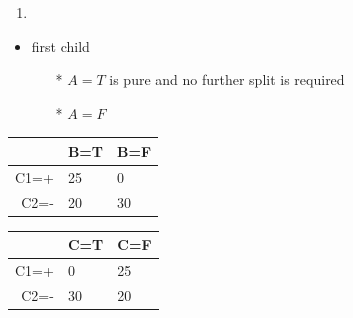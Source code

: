 \documentclass[11pt]{article}
\providecommand{\tightlist}{%
      \setlength{\itemsep}{0pt}\setlength{\parskip}{0pt}}
\begin{document}
    \begin{enumerate}
\def\labelenumi{(\alph{enumi})}
\setcounter{enumi}{1}
\item
\end{enumerate}

\begin{itemize}
\tightlist
\item
  first child

  \begin{itemize}
  \tightlist
  \item[*]
    \(A=T\) is pure and no further split is required
  \item[*]
    \(A=F\)
  \end{itemize}
\end{itemize}


\begin{table}[H]
	\centering
\begin{tabular}{|r|l|l|}
              & B=T & B=F \\
            \hline
                 C1=+ &  25    & 0 \\
                 C2=-   &  20    & 30 \\
\end{tabular}
\end{table}

\begin{table}[H]
	\centering
\begin{tabular}{|r|l|l|}
              & C=T & C=F \\
            \hline
                 C1=+ &  0    & 25 \\
                 C2=-   &  30    & 20 \\
\end{tabular}
\end{table}
\end{document}
